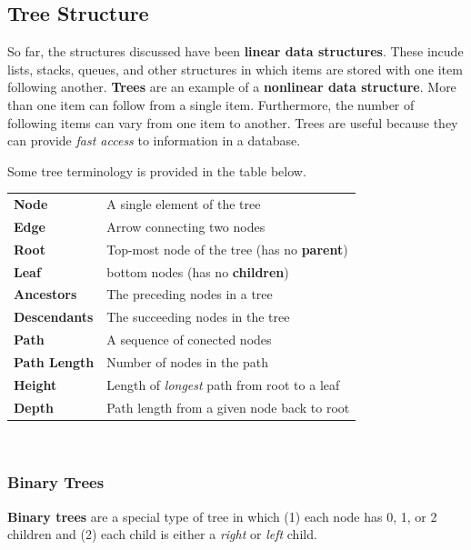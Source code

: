 \subsection{Tree Structure}

So far, the structures discussed have been \textbf{linear data structures}. These incude lists, stacks, queues, and other structures in which items are stored with one item following another. \textbf{Trees} are an example of a \textbf{nonlinear data structure}. More than one item can follow from a single item. Furthermore, the number of following items can vary from one item to another. Trees are useful because they can provide \textit{fast access} to information in a database. 

Some tree terminology is provided in the table below. \\


\begin{tabular}{p{}p{}}
\textbf{Node} & A single element of the tree \\
\textbf{Edge} & Arrow connecting two nodes \\
\textbf{Root} & Top-most node of the tree (has no \textbf{parent}) \\
\textbf{Leaf} & bottom nodes (has no \textbf{children}) \\
\textbf{Ancestors} & The preceding nodes in a tree \\
\textbf{Descendants} & The succeeding nodes in the tree \\
\textbf{Path} & A sequence of conected nodes \\
\textbf{Path Length} & Number of nodes in the path \\
\textbf{Height} & Length of \textit{longest} path from root to a leaf \\
\textbf{Depth} & Path length from a given node back to root \\
\end{tabular} \\

\subsubsection{Binary Trees}

\textbf{Binary trees} are a special type of tree in which (1) each node has 0, 1, or 2 children and (2) each child is either a \textit{right} or \textit{left} child. 

